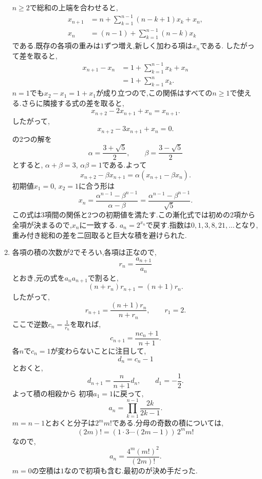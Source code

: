 \begin{enumerate}[label=\textbf{問\arabic*.},leftmargin=3.8em,format=\bookitemlink{practice-advanced}{solution}{problem}]
    $n\ge2$で総和の上端を合わせると,
    \begin{align*}
      x_{n+1}
      &=n+\sum_{k=1}^{n-1}(n-k+1)x_k+x_n,\\
      x_n
      &=(n-1)+\sum_{k=1}^{n-1}(n-k)x_k
    \end{align*}
    である.既存の各項の重みは$1$ずつ増え,新しく加わる項は$x_n$である.
    したがって差を取ると,
    \begin{align*}
      x_{n+1}-x_n
      &=1+\sum_{k=1}^{n-1}x_k+x_n\\
      &=1+\sum_{k=1}^{n}x_k.
    \end{align*}
    $n=1$でも$x_2-x_1=1+x_1$が成り立つので,この関係はすべての$n\ge1$で使える.さらに隣接する式の差を取ると,
    \[
      x_{n+2}-2x_{n+1}+x_n=x_{n+1}.
    \]
    したがって,
    \[
      x_{n+2}-3x_{n+1}+x_n=0.
    \]
    の2つの解を
    \[
      \alpha=\frac{3+\sqrt5}{2},\qquad
      \beta=\frac{3-\sqrt5}{2}
    \]
    とすると, $\alpha+\beta=3$, $\alpha\beta=1$である.よって
    \[
      x_{n+2}-\beta x_{n+1}
      =\alpha(x_{n+1}-\beta x_n).
    \]
    初期値$x_1=0$, $x_2=1$に合う形は
    \[
      x_n
      =\frac{\alpha^{n-1}-\beta^{n-1}}{\alpha-\beta}
      =\frac{\alpha^{n-1}-\beta^{n-1}}{\sqrt5}.
    \]
    この式は3項間の関係と2つの初期値を満たす.この漸化式では初めの2項から全項が決まるので,$x_n$に一致する.
    $a_n=2^{x_n}$で戻す.指数は$0,1,3,8,21,\ldots$となり,重み付き総和の差を二回取ると巨大な積を避けられた.
  \item 各項の積の次数が$2$でそろい,各項は正なので,
    \[
      r_n=\frac{a_{n+1}}{a_n}
    \]
    とおき,元の式を$a_na_{n+1}$で割ると,
    \[
      (n+r_n)r_{n+1}=(n+1)r_n.
    \]
    したがって,
    \[
      r_{n+1}=\frac{(n+1)r_n}{n+r_n},
      \qquad r_1=2.
    \]
    ここで逆数$c_n=\frac{1}{r_n}$を取れば,
    \[
      c_{n+1}=\frac{nc_n+1}{n+1}.
    \]
    各$n$で$c_n=1$が変わらないことに注目して,
    \[
      d_n=c_n-1
    \]
    とおくと,
    \[
      d_{n+1}=\frac{n}{n+1}d_n,\qquad d_1=-\frac12.
    \]
    よって積の相殺から
    \BookMathLayout{\[
        d_n=-\frac1{2n},\qquad
        c_n=\frac{2n-1}{2n},\qquad
        r_n=\frac{2n}{2n-1}.
      \]}{
      \[
        \begin{aligned}
          d_n&=-\frac1{2n},\\c_n&=\frac{2n-1}{2n},\\r_n&=\frac{2n}{2n-1}.
        \end{aligned}
      \]
    }
    初項$a_1=1$に戻って,
    \[
      a_n=\prod_{k=1}^{n-1}\frac{2k}{2k-1}.
    \]
    $m=n-1$とおくと分子は$2^m m!$である.分母の奇数の積については,
    \[
      (2m)!
      =(1\cdot3\cdots(2m-1))\,2^m m!
    \]
    なので,
    \[
      a_n=\frac{4^m(m!)^2}{(2m)!}.
    \]
    $m=0$の空積は$1$なので初項も含む.最初のが決め手だった.


\end{enumerate}
